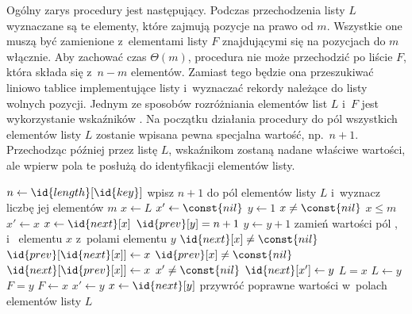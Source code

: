 \exercise %
Ogólny zarys procedury  jest następujący. Podczas przechodzenia listy $L$ wyznaczane są te elementy, które zajmują pozycje na prawo od $m$. Wszystkie one muszą być zamienione z~elementami listy $F$ znajdującymi się na pozycjach do $m$ włącznie. Aby zachować czas $\Theta(m)$, procedura nie może przechodzić po liście $F$, która składa się z~$n-m$ elementów. Zamiast tego będzie ona przeszukiwać liniowo tablice implementujące listy i~wyznaczać rekordy należące do listy wolnych pozycji. Jednym ze sposobów rozróżniania elementów list $L$ i~$F$ jest wykorzystanie wskaźników . Na początku działania procedury do pól  wszystkich elementów listy $L$ zostanie wpisana pewna specjalna wartość, np.\ $n+1$. Przechodząc później przez listę $L$, wskaźnikom  zostaną nadane właściwe wartości, ale wpierw pola te posłużą do identyfikacji elementów listy.
\begin{codebox}
\li	$n\gets\id{length}[\id{key}]$
\li	wpisz $n+1$ do pól  elementów listy $L$ i~wyznacz liczbę jej elementów $m$ \label{li:compactify-list-preprocess}
\li $x\gets L$
\li	$x'\gets\const{nil}$
\li	$y\gets1$
\li	\While $x\ne\const{nil}$ \label{li:compactify-list-while-begin}
\li		\Do
			\If $x\le m$
\li				\Then
					$x'\gets x$
\li					$x\gets\id{next}[x]$
\li				\Else
					\While $\id{prev}[y]=n+1$ \label{li:compactify-list-while2-begin}
\li						\Do $y\gets y+1$
						\End \label{li:compactify-list-while2-end}
\li					zamień wartości pól ,  i~ elementu $x$ z~polami elementu $y$ \label{li:compactify-list-swap}
\li					\If $\id{next}[x]\ne\const{nil}$ \label{li:compactify-list-fix-neighbors-begin}
\li						\Then $\id{prev}[\id{next}[x]]\gets x$
						\End
\li					\If $\id{prev}[x]\ne\const{nil}$
\li						\Then $\id{next}[\id{prev}[x]]\gets x$
						\End \label{li:compactify-list-fix-neighbors-end}
\li					\If $x'\ne\const{nil}$ \label{li:compactify-list-fix-predecessor-begin}
\li						\Then $\id{next}[x']\gets y$
						\End \label{li:compactify-list-fix-predecessor-end}
\li					\If $L=x$ \label{li:compactify-list-fix-heads-begin}
\li						\Then $L\gets y$
						\End
\li					\If $F=y$
\li						\Then $F\gets x$
						\End \label{li:compactify-list-fix-heads-end}
\li					$x'\gets y$
\li					$x\gets\id{next}[y]$
				\End
		\End \label{li:compactify-list-while-end}
\li	przywróć poprawne wartości w~polach  elementów listy $L$ \label{li:compactify-list-postprocess}
\end{codebox}

